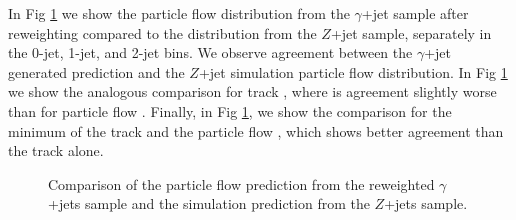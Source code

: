 In Fig \ref{fig:PhotonJetsClosureTest_TrackMET} we show the particle flow \met distribution 
from the $\gamma$+jet sample after reweighting compared to the \met distribution from the 
$Z$+jet sample, separately in the 0-jet, 1-jet, and 2-jet bins. We observe agreement between 
the $\gamma$+jet generated prediction and the $Z$+jet simulation particle flow \met distribution. 
In Fig \ref{fig:PhotonJetsClosureTest_TrackMET} we show the analogous comparison for track \met, where 
is agreement slightly worse than for particle flow \met. Finally, in 
Fig \ref{fig:PhotonJetsClosureTest_TrackMET}, we show the comparison for the minimum of the 
track \met and the particle flow \met, which shows better agreement than the track \met alone. 

\begin{figure}[!htbp]
\begin{center}
\caption{Comparison of the particle flow \met prediction from the reweighted $\gamma$+jets sample
and the simulation prediction from the $Z$+jets sample.}
\label{fig:PhotonJetsClosureTest_TrackMET}
\end{center}
\end{figure}

